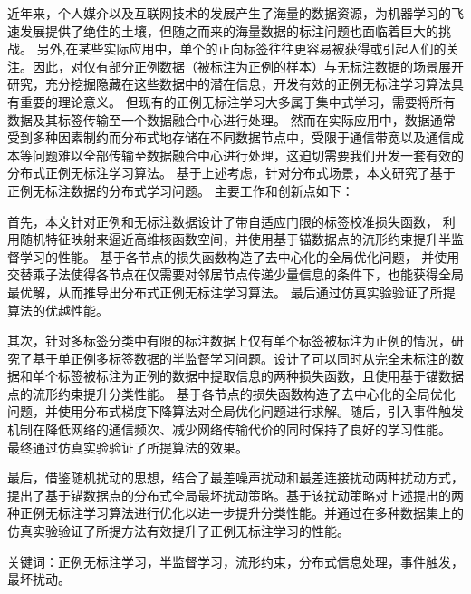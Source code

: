 \cleardoublepage
{}
近年来，个人媒介以及互联网技术的发展产生了海量的数据资源，为机器学习的飞速发展提供了绝佳的土壤，但随之而来的海量数据的标注问题也面临着巨大的挑战。
另外,在某些实际应用中，单个的正向标签往往更容易被获得或引起人们的关注。因此，对仅有部分正例数据（被标注为正例的样本）与无标注数据的场景展开研究，充分挖掘隐藏在这些数据中的潜在信息，开发有效的正例无标注学习算法具有重要的理论意义。
但现有的正例无标注学习大多属于集中式学习，需要将所有数据及其标签传输至一个数据融合中心进行处理。
然而在实际应用中，数据通常受到多种因素制约而分布式地存储在不同数据节点中，受限于通信带宽以及通信成本等问题难以全部传输至数据融合中心进行处理，这迫切需要我们开发一套有效的分布式正例无标注学习算法。
基于上述考虑，针对分布式场景，本文研究了基于正例无标注数据的分布式学习问题。
主要工作和创新点如下：

首先，本文针对正例和无标注数据设计了带自适应门限的标签校准损失函数，
利用随机特征映射来逼近高维核函数空间，并使用基于锚数据点的流形约束提升半监督学习的性能。
基于各节点的损失函数{构造}了去中心化的全局优化问题，
并使用交替乘子法使得各节点在仅需要对邻居节点传递少量信息的条件下，也能获得全局最优解，从而推导出分布式正例无标注学习算法。
最后通过仿真实验验证了所提算法的优越性能。

其次，针对多标签分类中有限的标注数据上仅有单个标签被标注为正例的情况，研究了基于单正例多标签数据的半监督学习问题。设计了可以同时从完全未标注的数据和单个标签被标注为正例的数据中提取信息的两种损失函数，且使用基于锚数据点的流形约束提升分类性能。
基于各节点的损失函数构造了去中心化的全局优化问题，并使用分布式梯度下降算法对全局优化问题进行求解。随后，引入事件触发机制在降低网络的通信频次、减少网络传输代价的同时保持了良好的学习性能。
最终通过仿真实验验证了所提算法的效果。

最后，借鉴随机扰动的思想，结合了最差噪声扰动和最差连接扰动两种扰动方式，提出了基于锚数据点的分布式全局最坏扰动策略。基于该扰动策略对上述提出的两种正例无标注学习算法进行优化以进一步提升分类性能。并通过在多种数据集上的仿真实验验证了所提方法有效提升了正例无标注学习的性能。

关键词：正例无标注学习，半监督学习，流形约束，分布式信息处理，事件触发，最坏扰动。

